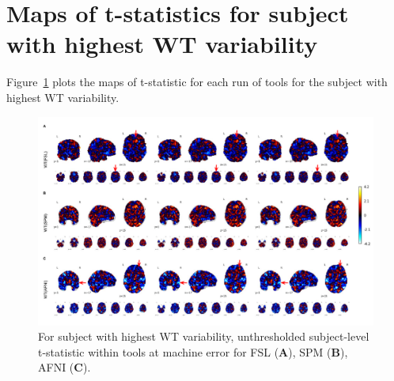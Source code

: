 


\section{Maps of t-statistics for subject with highest WT variability}
\label{sec:supp-worst-subject}

Figure~\ref{fig:unthresh-worst-sbj} plots the maps of t-statistic
for each run of tools for the subject with highest WT variability.

\begin{figure}[ht]
  \centering
  \includegraphics[width=\textwidth]{chapters/chapter3/figures/5-marked.pdf}
  \caption{For subject with highest WT variability, unthresholded subject-level t-statistic
  within tools at machine error for FSL (\textbf{A}),
  SPM (\textbf{B}), AFNI (\textbf{C}).}%
  \label{fig:unthresh-worst-sbj}
\end{figure}

